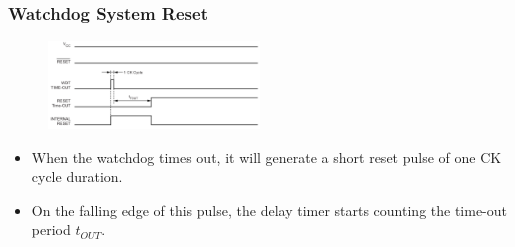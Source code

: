 \documentclass{article}
\begin{document}
\subsubsection{Watchdog System Reset}
\begin{figure}[H]
    \begin{center}
        \includegraphics[width=0.5\textwidth]{watchDogReset.png}
    \end{center}
\end{figure}
\begin{itemize}
    \item When the watchdog times out, it will generate a short reset pulse of one CK cycle duration.
    \item On the falling edge of this pulse,
    the delay timer starts counting the time-out period $t_{OUT}$.
\end{itemize}
\end{document}

